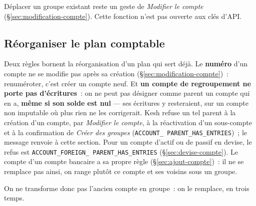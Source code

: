 \documentclass[a4paper,11pt,oneside]{article}
\begin{document}
Déplacer un groupe existant reste un geste de \emph{Modifier le compte}
(\S\ref{sec:modification-compte}). Cette fonction n'est pas ouverte aux clés d'API.

\subsection{Réorganiser le plan comptable}\label{sec:reorganiser-plan}

Deux règles bornent la réorganisation d'un plan qui sert déjà. Le \textbf{numéro} d'un compte ne
se modifie pas après sa création (\S\ref{sec:modification-compte})~: renuméroter, c'est créer un
compte neuf. Et \textbf{un compte de regroupement ne porte pas d'écritures}~: on ne peut pas
désigner comme parent un compte qui en a, \textbf{même si son solde est nul} --- ses écritures y
resteraient, sur un compte non imputable où plus rien ne les corrigerait. Kesh refuse un tel
parent à la création d'un compte, par \emph{Modifier le compte}, à la réactivation d'un
sous-compte et à la confirmation de \emph{Créer des groupes} (\texttt{ACCOUNT\_\allowbreak
PARENT\_\allowbreak HAS\_\allowbreak ENTRIES})~; le message renvoie à cette section. Pour un
compte d'actif ou de passif en devise, le refus est \texttt{ACCOUNT\_\allowbreak FOREIGN\_\allowbreak
PARENT\_\allowbreak HAS\_\allowbreak ENTRIES} (\S\ref{sec:devise-compte}).
Le compte d'un compte bancaire a sa propre règle (\S\ref{sec:ajout-compte})~: il ne se remplace
pas ainsi, on range plutôt ce compte et ses voisins sous un groupe.

On ne transforme donc pas l'ancien compte en groupe~: on le remplace, en trois temps.
\end{document}
